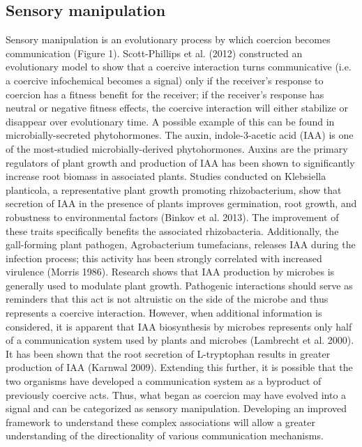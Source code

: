 \documentclass[PhD]{msu-thesis}
\begin{document}
\subsection{Sensory manipulation} 
Sensory manipulation is an evolutionary process by which coercion becomes communication (Figure 1). Scott-Phillips et al. (2012) constructed an evolutionary model to show that a coercive interaction turns communicative (i.e. a coercive infochemical becomes a signal) only if the receiver’s response to coercion has a fitness benefit for the receiver; if the receiver’s response has neutral or negative fitness effects, the coercive interaction will either stabilize or disappear over evolutionary time. 
A possible example of this can be found in microbially-secreted phytohormones. The auxin, indole-3-acetic acid (IAA) is one of the most-studied microbially-derived phytohormones. Auxins are the primary regulators of plant growth and production of IAA has been shown to significantly increase root biomass in associated plants. Studies conducted on Klebsiella planticola, a representative plant growth promoting rhizobacterium, show that secretion of IAA in the presence of plants improves germination, root growth, and robustness to environmental factors (Binkov et al. 2013). The improvement of these traits specifically benefits the associated rhizobacteria. Additionally, the gall-forming plant pathogen, Agrobacterium tumefacians, releases IAA during the infection process; this activity has been strongly correlated with increased virulence (Morris 1986). Research shows that IAA production by microbes is generally used to modulate plant growth. Pathogenic interactions should serve as reminders that this act is not altruistic on the side of the microbe and thus represents a coercive interaction. However, when additional information is considered, it is apparent that IAA biosynthesis by microbes represents only half of a communication system used by plants and microbes (Lambrecht et al. 2000). It has been shown that the root secretion of L-tryptophan results in greater production of IAA (Karnwal 2009). Extending this further, it is possible that the two organisms have developed a communication system as a byproduct of previously coercive acts. Thus, what began as coercion may have evolved into a signal and can be categorized as sensory manipulation. Developing an improved framework to understand these complex associations will allow a greater understanding of the directionality of various communication mechanisms. 
\end{document}
